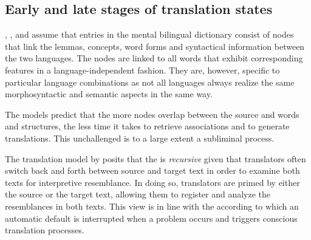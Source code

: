 \documentclass[output=paper]{LSP/langsci}
\begin{document}
\subsection{Early and late stages of translation states}
\label{carl-schaeffer:sec:2.3}
\largerpage
 
\citet{DeGroot1992Determinants}, \citet{Hartsuiker2004}, \citet{Pavlenko2009} and \citet{Schaeffer2013Shared} assume that entries in the mental bilingual dictionary consist of nodes that link the lemmas, concepts, word forms and syntactical information between the two languages. The nodes are linked to all words that exhibit corresponding features in a language-independent fashion. They are, however, specific to particular language combinations as not all languages always realize the same morphosyntactic and semantic aspects in the same way. 


The models predict that the more nodes overlap between the source and  words and structures, the less time it takes to retrieve associations and to generate translations. This unchallenged  is to a large extent a subliminal process. 

The translation model by \citet{Schaeffer2013Shared} posits that the  is \textit{recursive} given that translators often switch back and forth between source and target text in order to examine both texts for interpretive resemblance. In doing so, translators are primed by either the source or the target text, allowing them to register and analyze the resemblances in both texts. This view is in line with the  \citep{TirkkonenCondit2005} according to which an automatic default  is interrupted when a problem occurs and triggers conscious translation processes.
\end{document}
